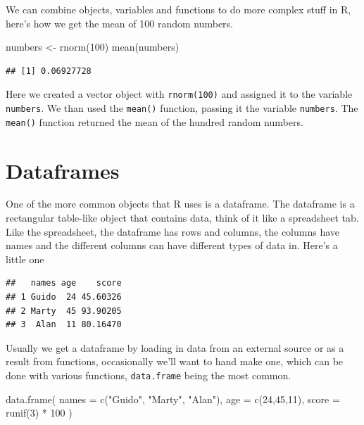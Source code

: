 \documentclass[
]{book}
\newenvironment{Shaded}{\begin{snugshade}}{\end{snugshade}}
\newcommand{\AttributeTok}[1]{\textcolor[rgb]{0.77,0.63,0.00}{#1}}
\newcommand{\DecValTok}[1]{\textcolor[rgb]{0.00,0.00,0.81}{#1}}
\newcommand{\FunctionTok}[1]{\textcolor[rgb]{0.00,0.00,0.00}{#1}}
\newcommand{\NormalTok}[1]{#1}
\newcommand{\OtherTok}[1]{\textcolor[rgb]{0.56,0.35,0.01}{#1}}
\newcommand{\SpecialCharTok}[1]{\textcolor[rgb]{0.00,0.00,0.00}{#1}}
\newcommand{\StringTok}[1]{\textcolor[rgb]{0.31,0.60,0.02}{#1}}
\begin{document}
We can combine objects, variables and functions to do more complex stuff in R, here's how we get the mean of 100 random numbers.

\begin{Shaded}
\begin{Highlighting}[]
\NormalTok{numbers }\OtherTok{\textless{}{-}} \FunctionTok{rnorm}\NormalTok{(}\DecValTok{100}\NormalTok{)}
\FunctionTok{mean}\NormalTok{(numbers)}
\end{Highlighting}
\end{Shaded}

\begin{verbatim}
## [1] 0.06927728
\end{verbatim}

Here we created a vector object with \texttt{rnorm(100)} and assigned it to the variable \texttt{numbers}. We than used the \texttt{mean()} function, passing it the variable \texttt{numbers}. The \texttt{mean()} function returned the mean of the hundred random numbers.

\hypertarget{dataframes}{%
\section{Dataframes}\label{dataframes}}

One of the more common objects that R uses is a dataframe. The dataframe is a rectangular table-like object that contains data, think of it like a spreadsheet tab. Like the spreadsheet, the dataframe has rows and columns, the columns have names and the different columns can have different types of data in. Here's a little one

\begin{verbatim}
##   names age    score
## 1 Guido  24 45.60326
## 2 Marty  45 93.90205
## 3  Alan  11 80.16470
\end{verbatim}

Usually we get a dataframe by loading in data from an external source or as a result from functions, occasionally we'll want to hand make one, which can be done with various functions, \texttt{data.frame} being the most common.

\begin{Shaded}
\begin{Highlighting}[]
\FunctionTok{data.frame}\NormalTok{(}
  \AttributeTok{names =} \FunctionTok{c}\NormalTok{(}\StringTok{"Guido"}\NormalTok{, }\StringTok{"Marty"}\NormalTok{, }\StringTok{"Alan"}\NormalTok{),}
  \AttributeTok{age =} \FunctionTok{c}\NormalTok{(}\DecValTok{24}\NormalTok{,}\DecValTok{45}\NormalTok{,}\DecValTok{11}\NormalTok{),}
  \AttributeTok{score =} \FunctionTok{runif}\NormalTok{(}\DecValTok{3}\NormalTok{) }\SpecialCharTok{*} \DecValTok{100}
\NormalTok{)}
\end{Highlighting}
\end{Shaded}
\end{document}
